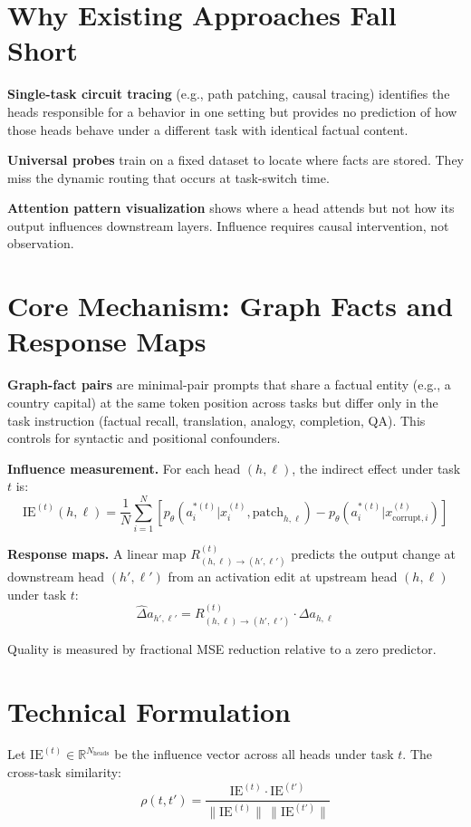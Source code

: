 \documentclass[10pt,twocolumn]{article}
\begin{document}
\section{Why Existing Approaches Fall Short}

\textbf{Single-task circuit tracing} (e.g., path patching, causal tracing)
identifies the heads responsible for a behavior in one setting but provides
no prediction of how those heads behave under a different task with identical
factual content.

\textbf{Universal probes} train on a fixed dataset to locate where facts are
stored. They miss the dynamic routing that occurs at task-switch time.

\textbf{Attention pattern visualization} shows where a head attends but not
how its output influences downstream layers. Influence requires causal
intervention, not observation.

\section{Core Mechanism: Graph Facts and Response Maps}

\textbf{Graph-fact pairs} are minimal-pair prompts that share a factual entity
(e.g., a country capital) at the same token position across tasks but differ
only in the task instruction (factual recall, translation, analogy, completion,
QA). This controls for syntactic and positional confounders.

\textbf{Influence measurement.} For each head $(h,\ell)$, the indirect effect
under task $t$ is:
\[
\mathrm{IE}^{(t)}(h,\ell) = \frac{1}{N}\sum_{i=1}^N
\!\left[p_\theta(a^{*(t)}_i|x^{(t)}_i,\mathrm{patch}_{h,\ell})
- p_\theta(a^{*(t)}_i|x^{(t)}_{\mathrm{corrupt},i})\right]
\]

\textbf{Response maps.} A linear map $R^{(t)}_{(h,\ell)\to(h',\ell')}$ predicts
the output change at downstream head $(h',\ell')$ from an activation edit at
upstream head $(h,\ell)$ under task $t$:
\[
\hat{\Delta}a_{h',\ell'} = R^{(t)}_{(h,\ell)\to(h',\ell')} \cdot \Delta a_{h,\ell}
\]

Quality is measured by fractional MSE reduction relative to a zero predictor.

\section{Technical Formulation}

Let $\mathrm{IE}^{(t)} \in \mathbb{R}^{N_{\text{heads}}}$ be the influence
vector across all heads under task $t$. The cross-task similarity:
\[
\rho(t, t') = \frac{\mathrm{IE}^{(t)} \cdot \mathrm{IE}^{(t')}}
                   {\|\mathrm{IE}^{(t)}\|\,\|\mathrm{IE}^{(t')}\|}
\]
\end{document}
